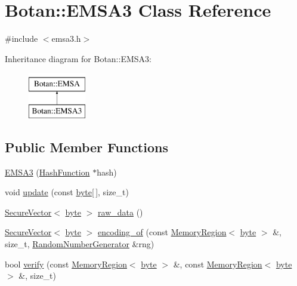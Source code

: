 \hypertarget{classBotan_1_1EMSA3}{\section{Botan\-:\-:E\-M\-S\-A3 Class Reference}
\label{classBotan_1_1EMSA3}
}


{\ttfamily \#include $<$emsa3.\-h$>$}

Inheritance diagram for Botan\-:\-:E\-M\-S\-A3\-:\begin{figure}[H]
\begin{center}
\leavevmode
\includegraphics[height=2.000000cm]{classBotan_1_1EMSA3}
\end{center}
\end{figure}
\subsection*{Public Member Functions}
\begin{DoxyCompactItemize}
\item 
\hyperlink{classBotan_1_1EMSA3_a14f337b042bf4a288ebb960fc3a2b41b}{E\-M\-S\-A3} (\hyperlink{classBotan_1_1HashFunction}{Hash\-Function} $\ast$hash)
\item 
void \hyperlink{classBotan_1_1EMSA3_ac1089dbeb00de8fd180e3eb9ddb2ee56}{update} (const \hyperlink{namespaceBotan_a7d793989d801281df48c6b19616b8b84}{byte}\mbox{[}$\,$\mbox{]}, size\-\_\-t)
\item 
\hyperlink{classBotan_1_1SecureVector}{Secure\-Vector}$<$ \hyperlink{namespaceBotan_a7d793989d801281df48c6b19616b8b84}{byte} $>$ \hyperlink{classBotan_1_1EMSA3_a5324be4668b015b03ff8b34ab8ce0f03}{raw\-\_\-data} ()
\item 
\hyperlink{classBotan_1_1SecureVector}{Secure\-Vector}$<$ \hyperlink{namespaceBotan_a7d793989d801281df48c6b19616b8b84}{byte} $>$ \hyperlink{classBotan_1_1EMSA3_afc7ecdffc20c6a88b44d64df0502b47d}{encoding\-\_\-of} (const \hyperlink{classBotan_1_1MemoryRegion}{Memory\-Region}$<$ \hyperlink{namespaceBotan_a7d793989d801281df48c6b19616b8b84}{byte} $>$ \&, size\-\_\-t, \hyperlink{classBotan_1_1RandomNumberGenerator}{Random\-Number\-Generator} \&rng)
\item 
bool \hyperlink{classBotan_1_1EMSA3_aba4a2ba7df9b6165a7190ea144def95c}{verify} (const \hyperlink{classBotan_1_1MemoryRegion}{Memory\-Region}$<$ \hyperlink{namespaceBotan_a7d793989d801281df48c6b19616b8b84}{byte} $>$ \&, const \hyperlink{classBotan_1_1MemoryRegion}{Memory\-Region}$<$ \hyperlink{namespaceBotan_a7d793989d801281df48c6b19616b8b84}{byte} $>$ \&, size\-\_\-t)
\end{DoxyCompactItemize}


